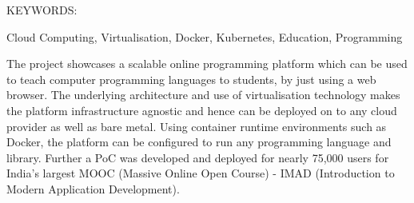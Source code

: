 \documentclass[DD]{iitmdiss}
\begin{document}




\abstract

\noindent KEYWORDS: \hspace*{0.5em} \parbox[t]{4.4in}{Cloud Computing, Virtualisation, Docker, Kubernetes, Education, Programming}

\vspace*{24pt}

\noindent The project showcases a scalable online programming platform which can be used to teach computer programming languages to students, by just using a web browser. The underlying architecture and use of virtualisation technology makes the platform infrastructure agnostic and hence can be deployed on to any cloud provider as well as bare metal. Using container runtime environments such as Docker, the platform can be configured to run any programming language and library. Further a PoC was developed and deployed for nearly 75,000 users for India's largest MOOC (Massive Online Open Course) - IMAD (Introduction to Modern Application Development).

\pagebreak


\begin{singlespace}
\tableofcontents
\thispagestyle{empty}

\listoftables
{}
\listoffigures
{}
\end{singlespace}


\abbreviations
\end{document}
